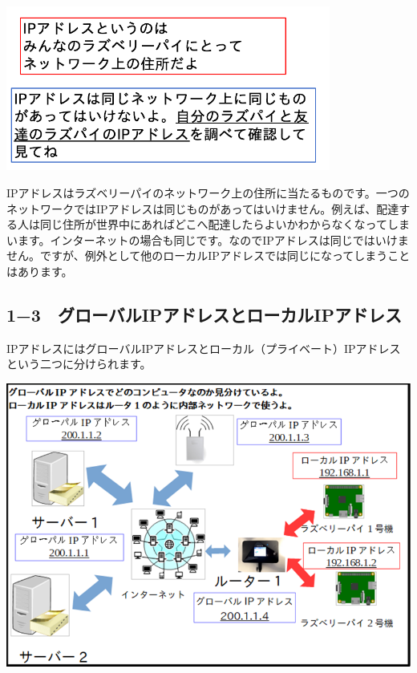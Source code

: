 \documentclass[a4paper,12pt,dvipdfmx]{jarticle}
\begin{document}
\centering
\includegraphics[width=0.8\textwidth]{ome7-img004.png}
\flushleft


\bigskip


\bigskip


\bigskip


\bigskip


\bigskip

IPアドレスはラズベリーパイのネットワーク上の住所に当たるものです。一つのネットワークではIPアドレスは同じものがあってはいけません。例えば、配達する人は同じ住所が世界中にあればどこへ配達したらよいかわからなくなってしまいます。インターネットの場合も同じです。なのでIPアドレスは同じではいけません。ですが、例外として他のローカルIPアドレスでは同じになってしまうことはあります。%

\clearpage\subsection*{\bfseries
	1−3　グローバルIPアドレスとローカルIPアドレス}
IPアドレスにはグローバルIPアドレスとローカル（プライベート）IPアドレスという二つに分けられます。



\centering
\includegraphics[width=15.0cm]{ome7-img005.png}
\end{document}
